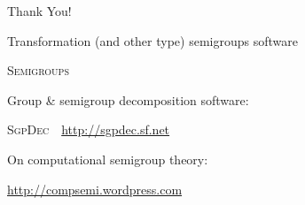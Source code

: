 \documentclass{beamer}
\newcommand{\SgpDec}{\textsc{SgpDec}}
\begin{document}
\begin{frame}
\begin{center}\Huge Thank You!\end{center}
\normalsize

Transformation (and other type) semigroups software
\begin{center}
\textsc{Semigroups}
\end{center}

Group \& semigroup decomposition software:
\begin{center}
\SgpDec\ \ \url{http://sgpdec.sf.net}
\end{center}

On computational semigroup theory:
\begin{center}
\url{http://compsemi.wordpress.com}
\end{center}


\end{frame}
\end{document}
